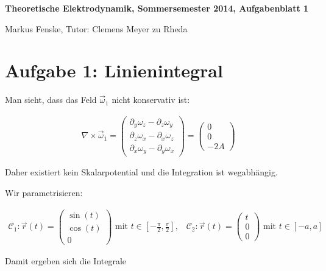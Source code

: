 \documentclass[a4paper,german,12pt,smallheadings]{scrartcl}
\begin{document}
\allowdisplaybreaks %
\begin{center}
\bfseries %
\sffamily %
\vspace{-40pt}
Theoretische Elektrodynamik, Sommersemester 2014, Aufgabenblatt 1

Markus Fenske, Tutor: Clemens Meyer zu Rheda
\vspace{-10pt}
\end{center}

\section*{Aufgabe 1: Linienintegral}

Man sieht, dass das Feld $\vec{\omega}_1$ nicht konservativ ist:

\begin{align*}
  \nabla \times \vec{\omega}_1
= \begin{pmatrix} \partial_y \omega_z - \partial_z \omega_y \\ \partial_z \omega_x - \partial_x \omega_z \\ \partial_x \omega_y - \partial_y \omega_x \end{pmatrix}
= \begin{pmatrix} 0 \\ 0 \\ -2A \end{pmatrix}
\end{align*}

Daher existiert kein Skalarpotential und die Integration ist wegabhängig.

Wir parametrisieren:

\begin{align*}
\mathcal{C}_1: \vec{r}(t) = \begin{pmatrix} \sin(t) \\ \cos(t) \\ 0\end{pmatrix} \text{ mit } t \in \left[-\frac{\pi}{2}, \frac{\pi}{2}\right], \;\;\;
  \mathcal{C}_2: \vec{r}(t) = \begin{pmatrix} t \\ 0 \\ 0\end{pmatrix} \text{ mit } t \in [-a,a]
\end{align*}

Damit ergeben sich die Integrale
\end{document}
